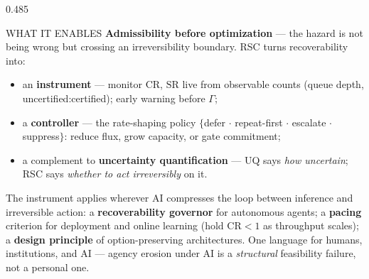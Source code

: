 \documentclass[final]{beamer}
\newlength{\colh}\setlength{\colh}{74cm}   %
\begin{document}
\begin{frame}[t]{}
\begin{columns}[t,totalwidth=\textwidth]
\begin{column}{0.485\textwidth}
\begin{minipage}[t][\colh][t]{\linewidth}
\vfill

\begin{rblock}{WHAT IT ENABLES}
{\color{rscblue}\bfseries Admissibility before optimization} --- the hazard is not being wrong but crossing an irreversibility boundary. RSC turns recoverability into:
\begin{itemize}
  \item an \textbf{instrument} --- monitor $\mathrm{CR}$, $\mathrm{SR}$ live from observable counts (queue depth, uncertified:certified); early warning before $\Gamma$;
  \item a \textbf{controller} --- the rate-shaping policy $\{$defer $\cdot$ repeat-first $\cdot$ escalate $\cdot$ suppress$\}$: reduce flux, grow capacity, or gate commitment;
  \item a complement to \textbf{uncertainty quantification} --- UQ says \emph{how uncertain}; RSC says \emph{whether to act irreversibly} on it.
\end{itemize}
\vspace{1mm}
The instrument applies wherever AI compresses the loop between inference and irreversible action: a \textbf{recoverability governor} for autonomous agents; a \textbf{pacing} criterion for deployment and online learning (hold $\mathrm{CR}<1$ as throughput scales); a \textbf{design principle} of option-preserving architectures. One language for humans, institutions, and AI --- agency erosion under AI is a \emph{structural} feasibility failure, not a personal one.
\end{rblock}

\vfill


\end{minipage}
\end{column}
\end{columns}
\end{frame}
\end{document}
